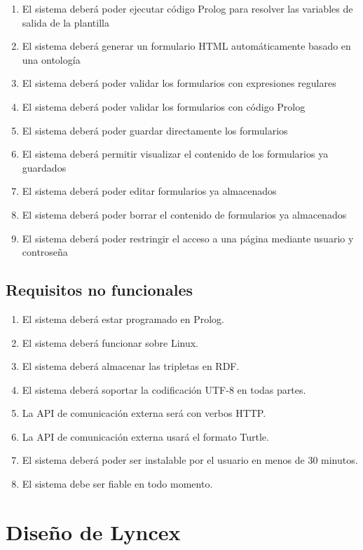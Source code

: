 \documentclass[12pt]{report} %
\begin{document}
\begin{enumerate}
    \item El sistema deberá poder ejecutar código Prolog para resolver las variables de salida de la plantilla
    \item El sistema deberá generar un formulario HTML automáticamente basado en una ontología
    \item El sistema deberá poder validar los formularios con expresiones regulares
    \item El sistema deberá poder validar los formularios con código Prolog
    \item El sistema deberá poder guardar directamente los formularios
    \item El sistema deberá permitir visualizar el contenido de los formularios ya guardados
    \item El sistema deberá poder editar formularios ya almacenados
    \item El sistema deberá poder borrar el contenido de formularios ya almacenados
    \item El sistema deberá poder restringir el acceso a una página mediante usuario y controseña
\end{enumerate}

\subsection{Requisitos no funcionales}
\begin{enumerate}
    \item El sistema deberá estar programado en Prolog.
    \item El sistema deberá funcionar sobre Linux.
    \item El sistema deberá almacenar las tripletas en RDF.
    \item El sistema deberá soportar la codificación UTF-8 en todas partes.
    \item La API de comunicación externa será con verbos HTTP.
    \item La API de comunicación externa usará el formato Turtle.
    \item El sistema deberá poder ser instalable por el usuario en menos de 30 minutos.
    \item El sistema debe ser fiable en todo momento.
\end{enumerate}

\section{Diseño de Lyncex}
\end{document}
